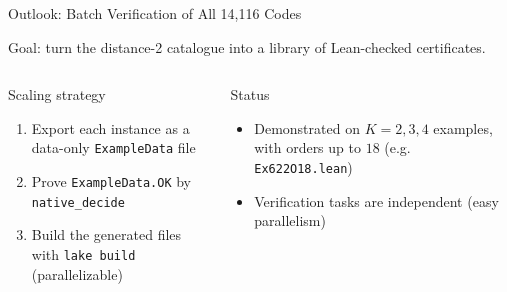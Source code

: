 \documentclass[aspectratio=169,t,10pt]{beamer}
\newcommand{\code}[1]{\texttt{\small #1}}
\begin{document}
\begin{frame}{Outlook: Batch Verification of All 14,116 Codes}

\small
Goal: turn the distance-2 catalogue into a library of Lean-checked certificates.

\begin{columns}[T]
\begin{block}{Scaling strategy}
\begin{enumerate}\setlength\itemsep{0pt}
\item Export each instance as a data-only \code{ExampleData} file
\item Prove \code{ExampleData.OK} by \code{native\_decide}
\item Build the generated files with \code{lake build} (parallelizable)
\end{enumerate}
\end{block}

\begin{exampleblock}{Status}
\begin{itemize}\setlength\itemsep{0pt}
\item Demonstrated on $K=2,3,4$ examples, with orders up to $18$ (e.g. \code{Ex622O18.lean})
\item Verification tasks are independent (easy parallelism)
\end{itemize}
\end{exampleblock}
\end{columns}
\end{frame}
\end{document}
